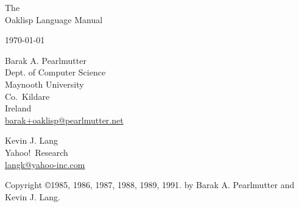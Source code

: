 %
%
%


\begin{titlepage}

\begin{center}

\vspace*{1in}

\Huge
 The \\
 Oaklisp Language Manual \\

\vspace{.5in}

\large
 \today \\

\vspace{.25in}


\vspace{.5in}

\Large
 Barak A. Pearlmutter \\
\large
 Dept. of Computer Science\\
 Maynooth University\\
 Co.\ Kildare\\
 Ireland\\
 \url{barak+oaklisp@pearlmutter.net}

\vspace{.5in}

\Large
 Kevin J. Lang \\
\large
 Yahoo!\ Research \\
 \url{langk@yahoo-inc.com}

\vfill


\end{center}

\end{titlepage}


\thispagestyle{empty}

\vspace*{6in}

\normalsize
\noindent Copyright \copyright 1985, 1986, 1987, 1988, 1989, 1991.
 by Barak A. Pearlmutter and Kevin J. Lang.

\newpage



